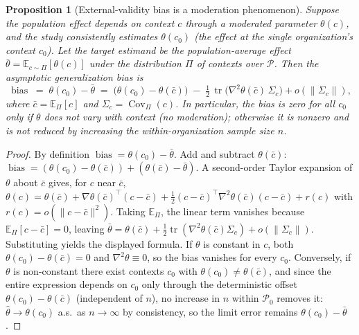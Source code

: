 \documentclass{amsart}
\newtheorem{proposition}{Proposition}
\theoremstyle{definition}
\begin{document}
\begin{proposition}[External-validity bias is a moderation phenomenon]
\label{prop:ev}
Suppose the population effect depends on context $c$ through a moderated
parameter $\theta(c)$, and the study consistently estimates
$\theta(c_0)$ (the effect at the single organization's context $c_0$).
Let the target estimand be the population-average effect
$\bar\theta=\mathbb{E}_{c\sim\Pi}[\theta(c)]$ under the distribution $\Pi$
of contexts over $\mathcal{P}$. Then the asymptotic generalization bias is
\[
  \operatorname{bias} \;=\; \theta(c_0)-\bar\theta
   \;=\; \big(\theta(c_0)-\theta(\bar c)\big)
        \;-\;\tfrac12\,\operatorname{tr}\!\big(\nabla^2\theta(\bar c)\,
        \Sigma_c\big)+o(\|\Sigma_c\|),
\]
where $\bar c=\mathbb{E}_\Pi[c]$ and $\Sigma_c=\operatorname{Cov}_\Pi(c)$.
In particular, the bias is zero for all $c_0$ \emph{only if} $\theta$ does
not vary with context (no moderation); otherwise it is nonzero and is
\emph{not} reduced by increasing the within-organization sample size $n$.
\end{proposition}

\begin{proof}
By definition $\operatorname{bias}=\theta(c_0)-\bar\theta$. Add and subtract
$\theta(\bar c)$: $\operatorname{bias}=(\theta(c_0)-\theta(\bar c)) +
(\theta(\bar c)-\bar\theta)$. A second-order Taylor expansion of
$\theta$ about $\bar c$ gives, for $c$ near $\bar c$,
$\theta(c)=\theta(\bar c)+\nabla\theta(\bar c)^{\!\top}(c-\bar c)
+\tfrac12 (c-\bar c)^{\!\top}\nabla^2\theta(\bar c)(c-\bar c)+r(c)$ with
$r(c)=o(\|c-\bar c\|^2)$. Taking $\mathbb{E}_\Pi$, the linear term vanishes
because $\mathbb{E}_\Pi[c-\bar c]=0$, leaving
$\bar\theta=\theta(\bar c)+\tfrac12\operatorname{tr}(\nabla^2\theta(\bar c)\Sigma_c)+o(\|\Sigma_c\|)$.
Substituting yields the displayed formula. If $\theta$ is constant in $c$,
both $\theta(c_0)-\theta(\bar c)=0$ and $\nabla^2\theta\equiv0$, so the bias
vanishes for every $c_0$. Conversely, if $\theta$ is non-constant there exist
contexts $c_0$ with $\theta(c_0)\neq\theta(\bar c)$, and since the entire
expression depends on $c_0$ only through the deterministic offset
$\theta(c_0)-\theta(\bar c)$ (independent of $n$), no increase in $n$ within
$\mathcal{P}_0$ removes it: $\widehat\theta\to\theta(c_0)$ a.s.\ as
$n\to\infty$ by consistency, so the limit error remains
$\theta(c_0)-\bar\theta$.
\end{proof}
\end{document}
